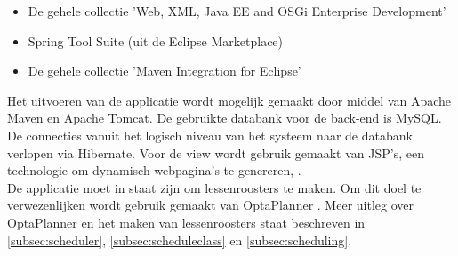 \begin{itemize}
	\item De gehele collectie 'Web, XML, Java EE and OSGi Enterprise Development'	
	\item Spring Tool Suite (uit de Eclipse Marketplace)
	\item De gehele collectie 'Maven Integration for Eclipse'
\end{itemize}
\noindent
Het uitvoeren van de applicatie wordt mogelijk gemaakt door middel van Apache Maven\cite{Maven} en Apache Tomcat\cite{Tomcat}.
De gebruikte databank voor de back-end is MySQL.
De connecties vanuit het logisch niveau van het systeem naar de databank verlopen via Hibernate\cite{hibernate}. 
Voor de view wordt gebruik gemaakt van JSP's, een technologie om dynamisch webpagina's te genereren, .\\

De applicatie moet in staat zijn om lessenroosters te maken.
Om dit doel te verwezenlijken wordt gebruik gemaakt van OptaPlanner \cite{optaplanner}. 
Meer uitleg over OptaPlanner en het maken van lessenroosters staat beschreven in \ref{subsec:scheduler}, \ref{subsec:scheduleclass} en \ref{subsec:scheduling}.